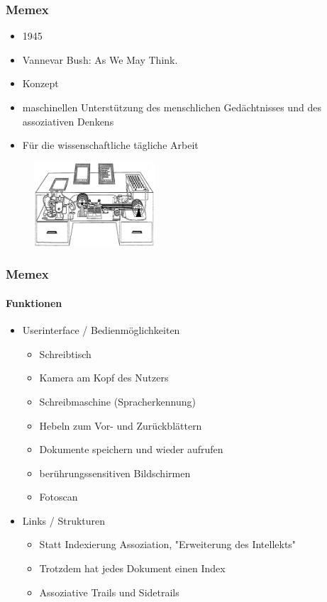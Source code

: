 \begin{frame}
\frametitle{Memex}
	\begin{itemize}
		\item 1945
		\item Vannevar Bush: As We May Think.
		\item Konzept
		\item maschinellen Unterstützung des menschlichen Gedächtnisses und des assoziativen Denkens
		\item Für die wissenschaftliche tägliche Arbeit
	\end{itemize}
	
	\begin{figure}[htbp]
		\centering
		\includegraphics[width=0.4\textwidth]{images/memex}
	\end{figure}

\end{frame}

\begin{frame}
	\frametitle{Memex}
	\framesubtitle{Funktionen}
	\begin{itemize}
		\item Userinterface / Bedienmöglichkeiten
		\begin{itemize}
			\item Schreibtisch
			\item Kamera am Kopf des Nutzers 
			\item Schreibmaschine (Spracherkennung)
			\item Hebeln zum Vor- und Zurückblättern
			\item Dokumente speichern und wieder aufrufen
			\item berührungssensitiven Bildschirmen 
			\item Fotoscan
		\end{itemize}
		\item Links / Strukturen
		\begin{itemize}
			\item Statt Indexierung Assoziation, "Erweiterung des Intellekts"
			\item Trotzdem hat jedes Dokument einen Index
			\item Assoziative Trails und Sidetrails
		\end{itemize}
	\end{itemize}
\end{frame}

